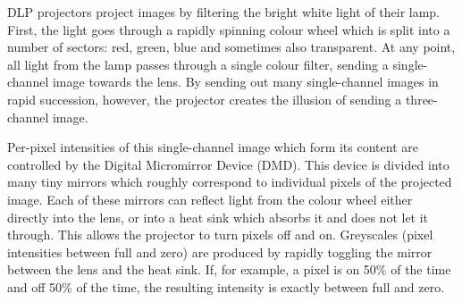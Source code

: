 DLP projectors project images by filtering the bright white light of their lamp. First, the light goes through a rapidly spinning colour wheel which is split into a number of sectors: red, green, blue and sometimes also transparent. At any point, all light from the lamp passes through a single colour filter, sending a single-channel image towards the lens. By sending out many single-channel images in rapid succession, however, the projector creates the illusion of sending a three-channel image.

Per-pixel intensities of this single-channel image which form its content are controlled by the Digital Micromirror Device (DMD). This device is divided into many tiny mirrors which roughly correspond to individual pixels of the projected image. Each of these mirrors can reflect light from the colour wheel either directly into the lens, or into a heat sink which absorbs it and does not let it through. This allows the projector to turn pixels off and on. Greyscales (pixel intensities between full and zero) are produced by rapidly toggling the mirror between the lens and the heat sink. If, for example, a pixel is on 50\% of the time and off 50\% of the time, the resulting intensity is exactly between full and zero.

